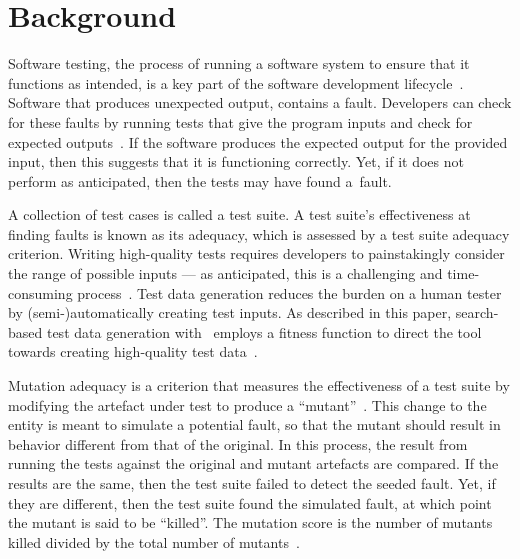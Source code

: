 \section{Background}\label{sec:background}


Software testing, the process of running a software system to ensure that it functions as intended, is a key part of the
software development lifecycle~\cite{Kapfhammer2004}. Software that produces unexpected output, contains a
fault. Developers can check for these faults by running tests that give the program inputs and check for expected
outputs~\cite{Kapfhammer2010}. If the software produces the expected output for the provided input, then this suggests
that it is functioning correctly. Yet, if it does not perform as anticipated, then the tests may have found \mbox{a
fault}.


A collection of test cases is called a test suite. A test suite's effectiveness at finding faults is known as its
adequacy, which is assessed by a test suite adequacy criterion.  Writing high-quality tests requires developers to
painstakingly consider the range of possible inputs --- as anticipated, this is a challenging and time-consuming
process~\cite{Fraser2015}. Test data generation reduces the burden on a human tester by (semi-)automatically creating
test inputs. As described in this paper, search-based test data generation with \sa~employs a fitness function to direct
the tool towards creating high-quality test data~\cite{STVR:STVR294}.



Mutation adequacy is a criterion that measures the effectiveness of a test suite by modifying the artefact under test to
produce a ``mutant''~\cite{Just2011a}. This change to the entity is meant to simulate a potential fault, so that the
mutant should result in behavior different from that of the original. In this process, the result from running the tests
against the original and mutant artefacts are compared. If the results are the same, then the test suite failed to
detect the seeded fault. Yet, if they are different, then the test suite found the simulated fault, at which point the
mutant is said to be ``killed''. The mutation score is the number of mutants killed divided by the total number of
mutants~\cite{Just2012b}.

